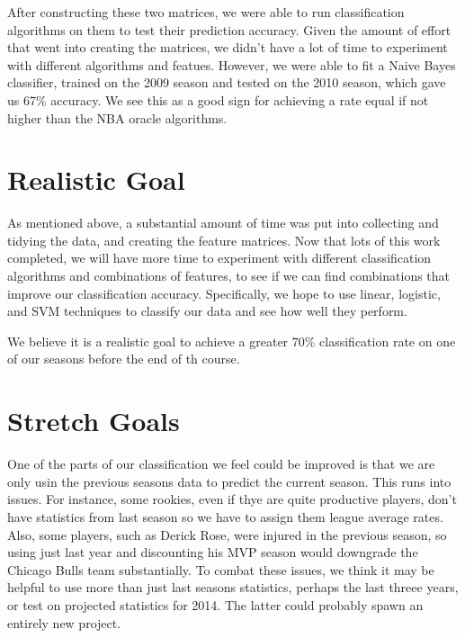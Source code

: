 \documentclass{article}
\begin{document}
	After constructing these two matrices, we were able to run classification algorithms on them to test their prediction accuracy. Given the amount of effort that went into creating the matrices, we didn't have a lot of time to experiment with different algorithms and featues. However, we were able to fit a Naive Bayes classifier, trained on the 2009 season and tested on the 2010 season, which gave us 67\% accuracy. We see this as a good sign for achieving a rate equal if not higher than the NBA oracle algorithms. 


\section*{Realistic Goal}
	As mentioned above, a substantial amount of time was put into collecting and tidying the data, and creating the feature matrices. Now that lots of this work completed, we will have more time to experiment with different classification algorithms and combinations of features, to see if we can find combinations that improve our classification accuracy. Specifically, we hope to use linear, logistic, and SVM techniques to classify our data and see how well they perform. 

	We believe it is a realistic goal to achieve a greater 70\% classification rate on one of our seasons before the end of th course. 

\section*{Stretch Goals}
	One of the parts of our classification we feel could be improved is that we are only usin the previous seasons data to predict the current season. This runs into issues. For instance, some rookies, even if thye are quite productive players, don't have statistics from last season so we have to assign them league average rates. Also, some players, such as Derick Rose, were injured in the previous season, so using just last year and discounting his MVP season would downgrade the Chicago Bulls team substantially. To combat these issues, we think it may be helpful to use more than just last seasons statistics, perhaps the last threee years, or test on projected statistics for 2014. The latter could probably spawn an entirely new project. \\
		
\end{document}
